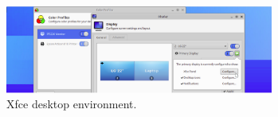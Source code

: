 \begin{figure}
	\centering
	\includegraphics[width=250pt]{chapters/chapter1/figures/xfce_demo.png}
	\caption{Xfce desktop environment.} \label{ch1fig:xfcedemo}
\end{figure}











